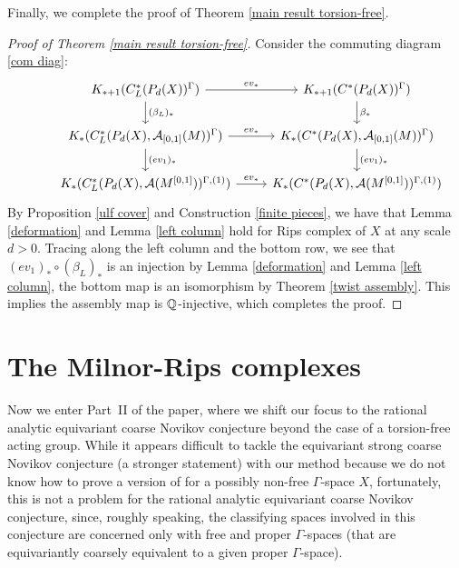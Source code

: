 \documentclass[11pt]{article}
\theoremstyle{definition}
\theoremstyle{plain}
\def\A{\mathcal A}\def\C{\mathcal C}\def\B{\mathcal B}\def\E{\mathcal E}\def\O{\mathcal O}\def\h{\mathfrak h}\def\K{\mathcal K}\def\F{\mathcal F}\def\P{\mathcal P}\def\L{\mathcal L}\def\R{\mathcal R}\def\Q{\mathcal Q}\def\H{\mathcal H}\def\S{\mathcal S}\def\N{\mathcal N}\def\U{\mathcal U}\def\V{\mathcal V}
\def\Ga{\Gamma}
\begin{document}
Finally, we complete the proof of Theorem \ref{main result torsion-free}.

\begin{proof}[Proof of Theorem \ref{main result torsion-free}]
Consider the commuting diagram \eqref{com diag}:
\[\begin{tikzcd}
& K_{*+1}(C^*_L(P_d(X))^{\Ga}) \arrow[r, "ev_*"] \arrow[d, "(\beta_L)_*"] & K_{*+1}(C^*(P_d(X))^{\Ga}) \arrow[d, "\beta_*"]   \\
& K_*(C^*_L(P_d(X),\A_{[0,1]}(M))^{\Ga})\arrow[r, "ev_*"] \arrow[d, "(ev_1)_*"]& K_*(C^*(P_d(X),\A_{[0,1]}(M))^{\Ga}) \arrow[d, "(ev_1)_*"]\\
& K_*(C^*_L(P_d(X),\A(M^{[0,1]}))^{\Ga,(1)})\arrow[r, "ev_*"] & K_*(C^*(P_d(X),\A(M^{[0,1]}))^{\Ga,(1)})
\end{tikzcd}\]
By Proposition \ref{ulf cover} and Construction \ref{finite pieces}, we have that Lemma \ref{deformation} and Lemma \ref{left column} hold for Rips complex of $X$ at any scale $d>0$. Tracing along the left column and the bottom row, we see that $(ev_1)_*\circ(\beta_L)_*$ is an injection by Lemma \ref{deformation} and Lemma \ref{left column}, the bottom map is an isomorphism by Theorem \ref{twist assembly}. This implies the assembly map is $\mathbb Q$-injective, which completes the proof.
\end{proof}
























\section{The Milnor-Rips complexes}\label{sec: The Milnor-Rips complex}

Now we enter Part~II of the paper, where we shift our focus to the rational analytic equivariant coarse Novikov conjecture beyond the case of a torsion-free acting group. 
While it appears difficult to tackle the equivariant strong coarse Novikov conjecture (a stronger statement) with our method because we do not know how to prove a version of  for a possibly non-free $\Ga$-space $X$, fortunately, this is not a problem for the rational analytic equivariant coarse Novikov conjecture, since, roughly speaking, the classifying spaces involved in this conjecture are concerned only with free and proper $\Gamma$-spaces (that are equivariantly coarsely equivalent to a given proper $\Gamma$-space). 
\end{document}
